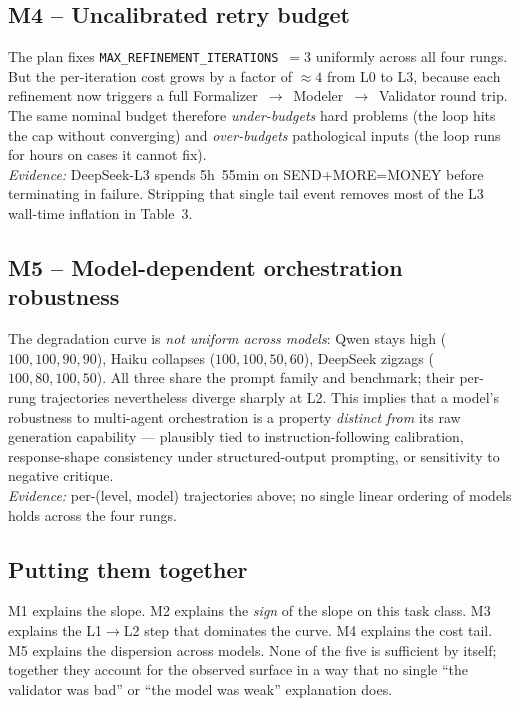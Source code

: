 \documentclass[11pt,a4paper]{article}
\begin{document}
\subsection{M4 -- Uncalibrated retry budget}
The plan fixes \texttt{MAX\_REFINEMENT\_ITERATIONS}~$=3$ uniformly across
all four rungs. But the per-iteration cost grows by a factor of
$\approx 4$ from L0 to L3, because each refinement now triggers a full
Formalizer~$\to$~Modeler~$\to$~Validator round trip. The same nominal
budget therefore \emph{under-budgets} hard problems (the loop hits the cap
without converging) and \emph{over-budgets} pathological inputs (the loop
runs for hours on cases it cannot fix).\\
\textit{Evidence:} DeepSeek-L3 spends 5h~55min on SEND+MORE=MONEY before
terminating in failure. Stripping that single tail event removes most of
the L3 wall-time inflation in Table~3.

\subsection{M5 -- Model-dependent orchestration robustness}
The degradation curve is \emph{not uniform across models}: Qwen stays high
($100,100,90,90$), Haiku collapses ($100,100,50,60$), DeepSeek zigzags
($100,80,100,50$). All three share the prompt family and benchmark; their
per-rung trajectories nevertheless diverge sharply at L2. This implies that
a model's robustness to multi-agent orchestration is a property
\emph{distinct from} its raw generation capability --- plausibly tied to
instruction-following calibration, response-shape consistency under
structured-output prompting, or sensitivity to negative critique.\\
\textit{Evidence:} per-(level, model) trajectories above; no single linear
ordering of models holds across the four rungs.

\subsection{Putting them together}
M1 explains the slope. M2 explains the \emph{sign} of the slope on this task
class. M3 explains the L1$\to$L2 step that dominates the curve. M4 explains
the cost tail. M5 explains the dispersion across models. None of the five is
sufficient by itself; together they account for the observed surface in a way
that no single ``the validator was bad'' or ``the model was weak'' explanation
does.

\end{document}
